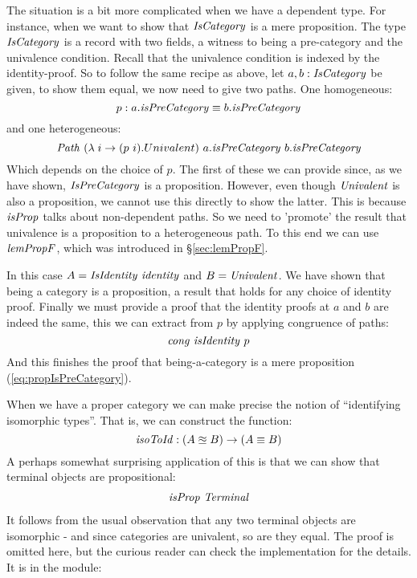 The situation is a bit more complicated when we have a dependent type.
For instance, when we want to show that $\IsCategory$ is a mere
proposition. The type $\IsCategory$ is a record with two fields, a
witness to being a pre-category and the univalence condition. Recall
that the univalence condition is indexed by the identity-proof. So to
follow the same recipe as above, let $a, b \tp \IsCategory$ be given,
to show them equal, we now need to give two paths. One homogeneous:
%
$$
p \tp a.\isPreCategory \equiv b.\isPreCategory
$$
%
and one heterogeneous:
%
$$
\Path\ (\lambda\; i \to (p\ i).Univalent)\ a.\isPreCategory\ b.\isPreCategory
$$
%
Which depends on the choice of $p$. The first of these we can provide since, as
we have shown, $\IsPreCategory$ is a proposition. However, even though
$\Univalent$ is also a proposition, we cannot use this directly to show the
latter. This is because $\isProp$ talks about non-dependent paths. So we need to
'promote' the result that univalence is a proposition to a heterogeneous path.
To this end we can use $\lemPropF$, which was introduced in \S\ref{sec:lemPropF}.

In this case $A = \var{IsIdentity}\ \identity$ and $B = \Univalent$. We have
shown that being a category is a proposition, a result that holds for any choice
of identity proof. Finally we must provide a proof that the identity proofs at
$a$ and $b$ are indeed the same, this we can extract from $p$ by applying
congruence of paths:
%
$$
\congruence\ \isIdentity\ p
$$
%
And this finishes the proof that being-a-category is a mere proposition
(\ref{eq:propIsPreCategory}).

When we have a proper category we can make precise the notion of
``identifying isomorphic types''. That is, we can construct the
function:
%
$$
\isoToId \tp (A \approxeq B) \to (A \equiv B)
$$
%
A perhaps somewhat surprising application of this is that we can show that
terminal objects are propositional:
%
\begin{align}
\label{eq:termProp}
\isProp\ \var{Terminal}
\end{align}
%
It follows from the usual observation that any two terminal objects are
isomorphic - and since categories are univalent, so are they equal. The proof is
omitted here, but the curious reader can check the implementation for the
details. It is in the module:
%
\begin{center}
\end{center}

